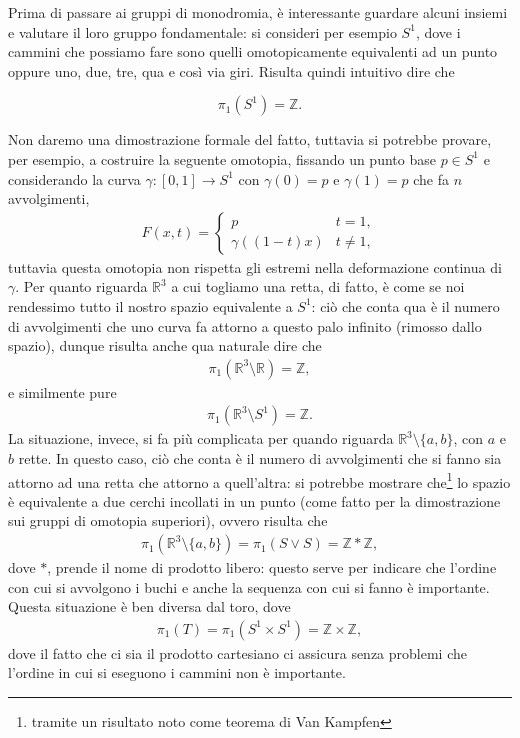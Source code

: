 Prima di passare ai gruppi di monodromia, è interessante guardare alcuni insiemi e valutare il loro gruppo fondamentale: si consideri per esempio $S^1$, dove i cammini che possiamo fare sono quelli omotopicamente equivalenti ad un punto oppure uno, due, tre, qua e così via giri. Risulta quindi intuitivo dire che
\begin{prop}
    \begin{equation}
        \pi_1(S^1) = \mathbb{Z}.
    \end{equation}
\end{prop}
Non daremo una dimostrazione formale del fatto, tuttavia si potrebbe provare, per esempio, a costruire la seguente omotopia, fissando un punto base $p \in S^1$ e considerando la curva $\gamma: [0,1] \to S^1$ con $\gamma(0) = p$ e $\gamma(1) = p$ che fa $n$ avvolgimenti,
\begin{align}
    F(x, t) = \begin{cases}
        p & t = 1, \\
        \gamma((1-t)x) & t \neq 1,
    \end{cases}
\end{align}
tuttavia questa omotopia non rispetta gli estremi nella deformazione continua di $\gamma$. Per quanto riguarda $\mathbb{R}^3$ a cui togliamo una retta, di fatto, è come se noi rendessimo tutto il nostro spazio equivalente a $S^1$: ciò che conta qua è il numero di avvolgimenti che uno curva fa attorno a questo palo infinito (rimosso dallo spazio), dunque risulta anche qua naturale dire che
\begin{align}
    \pi_1(\mathbb{R}^3 \setminus \mathbb{R}) = \mathbb{Z},
\end{align}
e similmente pure
\begin{align}
    \pi_1(\mathbb{R}^3 \setminus S^1) = \mathbb{Z}.
\end{align}
La situazione, invece, si fa più complicata per quando riguarda $\mathbb{R}^3 \setminus \{ a, b \}$, con $a$ e $b$ rette. In questo caso, ciò che conta è il numero di avvolgimenti che si fanno sia attorno ad una retta che attorno a quell'altra: si potrebbe mostrare che\footnote{tramite un risultato noto come teorema di Van Kampfen} lo spazio è equivalente a due cerchi incollati in un punto (come fatto per la dimostrazione sui gruppi di omotopia superiori), ovvero risulta che
\begin{align}
    \pi_1(\mathbb{R}^3 \setminus \{ a, b\}) = \pi_1(S \vee S) = \mathbb{Z} \ast \mathbb{Z},
\end{align}
dove $\ast$, prende il nome di prodotto libero: questo serve per indicare che l'ordine con cui si avvolgono i buchi e anche la sequenza con cui si fanno è importante.  Questa situazione è ben diversa dal toro, dove
\begin{align}
    \pi_1(T) = \pi_1(S^1 \times S^1) = \mathbb{Z} \times \mathbb{Z},
\end{align}
dove il fatto che ci sia il prodotto cartesiano ci assicura senza problemi che l'ordine in cui si eseguono i cammini non è importante.

